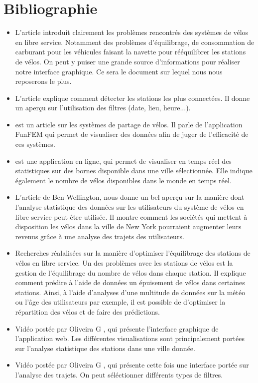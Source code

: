 \documentclass[12pt]{article}
\begin{document}
	\section{Bibliographie}
		\begin{itemize}
			\item L'article \cite{Oli16} introduit clairement les problèmes rencontrés
			des systèmes de vélos en libre service. Notamment des problèmes d'équilibrage,
			de consommation de carburant pour les véhicules faisant la navette pour
			rééquilibrer les stations de vélos. On peut y puiser une grande source
			d'informations pour réaliser notre interface graphique. Ce sera le document sur
			lequel nous nous reposerons le plus.

			\item L'article \cite{Ali14} explique comment détecter les stations les plus
			connectées. Il donne un aperçu sur  l'utilisation des filtres (date, lieu, heure...).

			\item \cite{BC16} est un article sur les systèmes de partage de vélos. Il parle
			de l'application FunFEM qui permet de visualiser des données afin de juger de
			l'efficacité de ces systèmes.

			\item \cite{BSM17} est une application en ligne, qui permet de visualiser en
			temps réel des statistiques sur des bornes disponible dans une ville
			sélectionnée.  Elle indique également le nombre de vélos disponibles dans le
			monde en temps réel.

			\item L'article \cite{BW} de Ben Wellington, nous donne un bel aperçu sur la
			manière dont l'analyse statistique des données sur les utilisateurs du système de
			vélos en libre service peut être utilisée. Il montre comment les sociétés qui
			mettent à disposition les vélos dans la ville de New York pourraient augmenter
			leurs revenus grâce à une analyse des trajets des utilisateurs.

			\item \cite{JL} Recherches réalalisées sur la manière d'optimiser l'équilibrage
			des stations de vélos en libre service. Un des problèmes avec les stations de vélos
			est la gestion de l'équilibrage du nombre de  vélos dans chaque station. Il explique
			comment prédire à l'aide de données un épuisement de vélos dans certaines stations.
			Ainsi, à l'aide d'analyses d'une multitude de données sur la météo ou l'âge des
			utilisateurs par exemple, il est possible de d'optimiser la répartition des vélos et
			de faire des prédictions.

			\item Vidéo postée par Oliveira G \cite{state_station}, qui présente l'interface
			graphique de l'application web. Les différentes visualisations sont principalement
			portées sur l'analyse statistique des stations dans une ville donnée.

			\item Vidéo postée par Oliveira G \cite{trips}, qui présente cette fois une
			interface portée sur l'analyse des trajets. On peut séléctionner différents types
			de filtres.
		\end{itemize}
\end{document}
